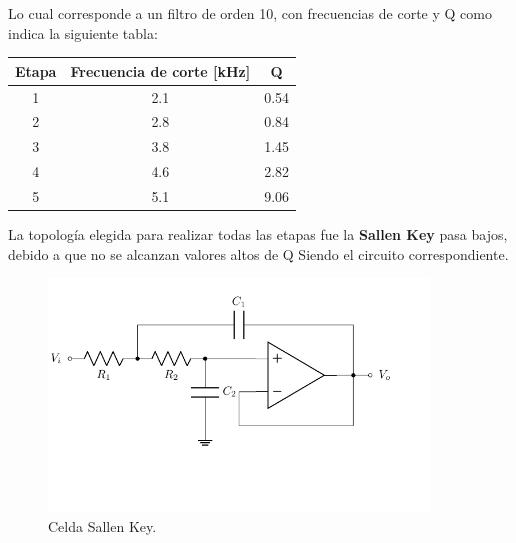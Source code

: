 Lo cual corresponde a un filtro de orden 10, con frecuencias de corte y Q como indica la siguiente tabla:
\begin{table}[H]
\centering
\begin{tabular}{ccc}
\textbf{Etapa} & \textbf{Frecuencia de corte [kHz]} & \textbf{Q} \\ \hline
1 & 2.1 & 0.54 \\
2 & 2.8 & 0.84 \\
3 & 3.8 & 1.45 \\
4 & 4.6 & 2.82 \\
5 & 5.1 & 9.06
\end{tabular}
\end{table}
La topología elegida para realizar todas las  etapas fue la \textbf{Sallen Key} pasa bajos, debido a que no se alcanzan valores altos de Q
Siendo el circuito correspondiente.

\begin{figure}[H]
\centering
	\includegraphics[width=0.9\textwidth]{ImagenesEjercicio2/SK.pdf}
	\caption{Celda Sallen Key.}
	\label{fig:SK}
\end{figure}

